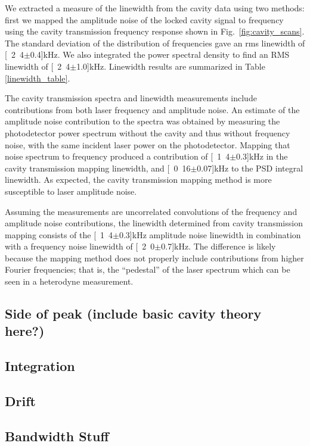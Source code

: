 We extracted a measure of the linewidth from the cavity data using two methods: first we mapped the amplitude noise of the locked cavity signal to frequency using the cavity transmission frequency response shown in Fig.~\ref{fig:cavity_scans}.
The standard deviation of the distribution of frequencies gave an \gls*{rms} linewidth of \unit[2.4$\pm$0.4]{kHz}.
We also integrated the power spectral density to find an RMS linewidth \cite{negnevitsky_wideband_2013} of \unit[2.4$\pm$1.0]{kHz}.
Linewidth results are summarized in Table \ref{linewidth_table}.

The cavity transmission spectra and linewidth measurements include contributions from both laser frequency and amplitude noise.
An estimate of the amplitude noise contribution to the spectra was obtained by measuring the photodetector power spectrum without the cavity and thus without frequency noise, with the same incident laser power on the photodetector.
Mapping that noise spectrum to frequency produced a contribution of \unit[1.4$\pm$0.3]{kHz} in the cavity transmission mapping linewidth,  and \unit[0.16$\pm$0.07]{kHz} to the PSD integral linewidth.
As expected, the cavity transmission mapping method is more susceptible to laser amplitude noise. 

Assuming the measurements are uncorrelated convolutions of the frequency and amplitude noise contributions, the linewidth determined from cavity transmission mapping consists of the \unit[1.4$\pm$0.3]{kHz} amplitude noise linewidth in combination with a frequency noise linewidth of \unit[2.0$\pm$0.7]{kHz}.
The difference is likely because the mapping method does not properly include contributions from higher Fourier frequencies; that is, the ``pedestal'' of the laser spectrum which can be seen in a heterodyne measurement.

\subsection{Side of peak (include basic cavity theory here?)}
\subsection{Integration}
\subsection{Drift}
\subsection{Bandwidth Stuff}
